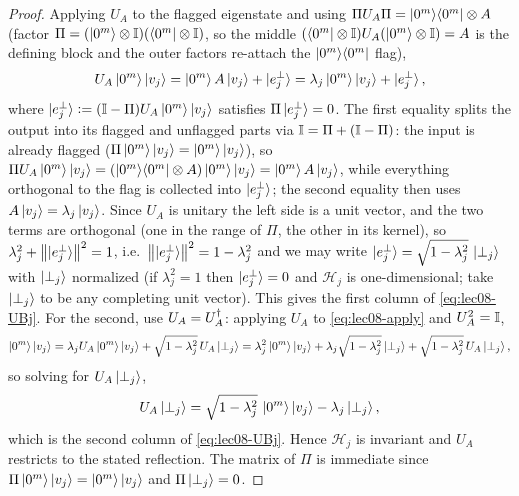 \begin{proof}
Applying $U_A$ to the flagged eigenstate and using
$\Pi U_A\Pi=\ket{0^m}\!\bra{0^m}\otimes A$ (factor $\Pi=(\ket{0^m}\otimes\mathbb{I})(\bra{0^m}\otimes\mathbb{I})$,
so the middle $(\bra{0^m}\otimes\mathbb{I})U_A(\ket{0^m}\otimes\mathbb{I})=A$ is the defining block and
the outer factors re-attach the $\ket{0^m}\!\bra{0^m}$ flag),
\begin{equation}
  U_A\ket{0^m}\ket{v_j}=\ket{0^m}A\ket{v_j}+\ket{e_j^\perp}
  =\lambda_j\ket{0^m}\ket{v_j}+\ket{e_j^\perp},
  \label{eq:lec08-apply}
\end{equation}
where $\ket{e_j^\perp}\vcentcolon=(\mathbb{I}-\Pi)U_A\ket{0^m}\ket{v_j}$ satisfies
$\Pi\ket{e_j^\perp}=0$. The first equality splits the output into its flagged and
unflagged parts via $\mathbb{I}=\Pi+(\mathbb{I}-\Pi)$: the input is already flagged
($\Pi\ket{0^m}\ket{v_j}=\ket{0^m}\ket{v_j}$), so
$\Pi U_A\ket{0^m}\ket{v_j}=(\ket{0^m}\!\bra{0^m}\otimes A)\ket{0^m}\ket{v_j}=\ket{0^m}A\ket{v_j}$,
while everything orthogonal to the flag is collected into $\ket{e_j^\perp}$; the second
equality then uses $A\ket{v_j}=\lambda_j\ket{v_j}$. Since $U_A$ is unitary the left side
is a unit vector, and the two terms are orthogonal (one in the range of $\Pi$, the other
in its kernel), so $\lambda_j^2+\left\lVert \ket{e_j^\perp} \right\rVert^2=1$, i.e.\
$\left\lVert \ket{e_j^\perp} \right\rVert^2=1-\lambda_j^2$ and we may write
$\ket{e_j^\perp}=\sqrt{1-\lambda_j^2}\,\ket{\perp_j}$ with $\ket{\perp_j}$
normalized (if $\lambda_j^2=1$ then $\ket{e_j^\perp}=0$ and $\mathcal H_j$ is
one-dimensional; take $\ket{\perp_j}$ to be any completing unit vector). This gives
the first column of \eqref{eq:lec08-UBj}. For the second, use $U_A=U_A^{\dagger}$: applying
$U_A$ to \eqref{eq:lec08-apply} and $U_A^2=\mathbb{I}$,
\begin{equation}
  \ket{0^m}\ket{v_j}=\lambda_j U_A\ket{0^m}\ket{v_j}
   +\sqrt{1-\lambda_j^2}\,U_A\ket{\perp_j}
  =\lambda_j^2\ket{0^m}\ket{v_j}+\lambda_j\sqrt{1-\lambda_j^2}\ket{\perp_j}
   +\sqrt{1-\lambda_j^2}\,U_A\ket{\perp_j},
  \label{eq:lec08-apply2}
\end{equation}
so solving for $U_A\ket{\perp_j}$,
\begin{equation}
  U_A\ket{\perp_j}=\sqrt{1-\lambda_j^2}\,\ket{0^m}\ket{v_j}-\lambda_j\ket{\perp_j},
  \label{eq:lec08-perp}
\end{equation}
which is the second column of \eqref{eq:lec08-UBj}. Hence $\mathcal H_j$ is invariant
and $U_A$ restricts to the stated reflection. The matrix of $\Pi$ is immediate since
$\Pi\ket{0^m}\ket{v_j}=\ket{0^m}\ket{v_j}$ and $\Pi\ket{\perp_j}=0$.
\end{proof}

